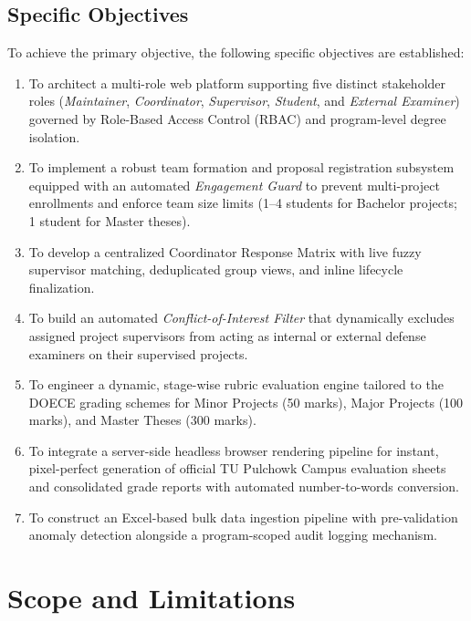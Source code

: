 \subsection{Specific Objectives}
To achieve the primary objective, the following specific objectives are established:
\begin{enumerate}[label=\arabic*.]
    \item To architect a multi-role web platform supporting five distinct stakeholder roles (\textit{Maintainer}, \textit{Coordinator}, \textit{Supervisor}, \textit{Student}, and \textit{External Examiner}) governed by Role-Based Access Control (RBAC) and program-level degree isolation.
    \item To implement a robust team formation and proposal registration subsystem equipped with an automated \textit{Engagement Guard} to prevent multi-project enrollments and enforce team size limits (1--4 students for Bachelor projects; 1 student for Master theses).
    \item To develop a centralized Coordinator Response Matrix with live fuzzy supervisor matching, deduplicated group views, and inline lifecycle finalization.
    \item To build an automated \textit{Conflict-of-Interest Filter} that dynamically excludes assigned project supervisors from acting as internal or external defense examiners on their supervised projects.
    \item To engineer a dynamic, stage-wise rubric evaluation engine tailored to the DOECE grading schemes for Minor Projects (50 marks), Major Projects (100 marks), and Master Theses (300 marks).
    \item To integrate a server-side headless browser rendering pipeline for instant, pixel-perfect generation of official TU Pulchowk Campus evaluation sheets and consolidated grade reports with automated number-to-words conversion.
    \item To construct an Excel-based bulk data ingestion pipeline with pre-validation anomaly detection alongside a program-scoped audit logging mechanism.
\end{enumerate}

\section{Scope and Limitations}

